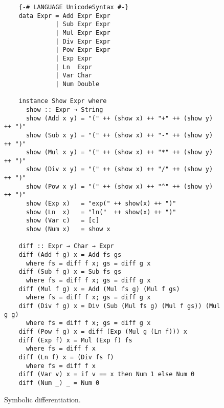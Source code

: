 \begin{figure}[!ht]
\centering
\begin{verbatim}
    {-# LANGUAGE UnicodeSyntax #-}
    data Expr = Add Expr Expr
              | Sub Expr Expr
              | Mul Expr Expr
              | Div Expr Expr
              | Pow Expr Expr
              | Exp Expr
              | Ln  Expr
              | Var Char
              | Num Double
    
    instance Show Expr where
      show :: Expr → String          
      show (Add x y) = "(" ++ (show x) ++ "+" ++ (show y) ++ ")"
      show (Sub x y) = "(" ++ (show x) ++ "-" ++ (show y) ++ ")"
      show (Mul x y) = "(" ++ (show x) ++ "*" ++ (show y) ++ ")"
      show (Div x y) = "(" ++ (show x) ++ "/" ++ (show y) ++ ")"
      show (Pow x y) = "(" ++ (show x) ++ "^" ++ (show y) ++ ")"
      show (Exp x)   = "exp(" ++ show(x) ++ ")"
      show (Ln  x)   = "ln("  ++ show(x) ++ ")"
      show (Var c)   = [c]
      show (Num x)   = show x
    
    diff :: Expr → Char → Expr
    diff (Add f g) x = Add fs gs
      where fs = diff f x; gs = diff g x
    diff (Sub f g) x = Sub fs gs
      where fs = diff f x; gs = diff g x
    diff (Mul f g) x = Add (Mul fs g) (Mul f gs)
      where fs = diff f x; gs = diff g x
    diff (Div f g) x = Div (Sub (Mul fs g) (Mul f gs)) (Mul g g)
      where fs = diff f x; gs = diff g x
    diff (Pow f g) x = diff (Exp (Mul g (Ln f))) x 
    diff (Exp f) x = Mul (Exp f) fs
      where fs = diff f x
    diff (Ln f) x = (Div fs f)
      where fs = diff f x
    diff (Var v) x = if v == x then Num 1 else Num 0
    diff (Num _) _ = Num 0
\end{verbatim}
\vspace*{-0.3cm}
\caption{Symbolic differentiation.}
\label{fig:differentiate.hs}
\end{figure}








